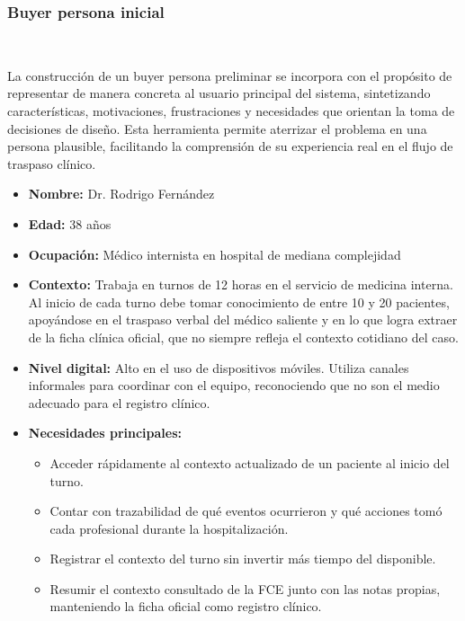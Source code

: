\subsubsection*{Buyer persona inicial} ~

La construcción de un buyer persona preliminar se incorpora con el propósito de representar de manera concreta al usuario principal del sistema, sintetizando características, motivaciones, frustraciones y necesidades que orientan la toma de decisiones de diseño. Esta herramienta permite aterrizar el problema en una persona plausible, facilitando la comprensión de su experiencia real en el flujo de traspaso clínico.\\

\begin{itemize}
    \item \textbf{Nombre:} Dr. Rodrigo Fernández
    \item \textbf{Edad:} 38 años
    \item \textbf{Ocupación:} Médico internista en hospital de mediana complejidad
    \item \textbf{Contexto:} Trabaja en turnos de 12 horas en el servicio de medicina interna. Al inicio de cada turno debe tomar conocimiento de entre 10 y 20 pacientes, apoyándose en el traspaso verbal del médico saliente y en lo que logra extraer de la ficha clínica oficial, que no siempre refleja el contexto cotidiano del caso.
    \item \textbf{Nivel digital:} Alto en el uso de dispositivos móviles. Utiliza canales informales para coordinar con el equipo, reconociendo que no son el medio adecuado para el registro clínico.

    \item \textbf{Necesidades principales:}
    \begin{itemize}
        \item Acceder rápidamente al contexto actualizado de un paciente al inicio del turno.
        \item Contar con trazabilidad de qué eventos ocurrieron y qué acciones tomó cada profesional durante la hospitalización.
        \item Registrar el contexto del turno sin invertir más tiempo del disponible.
        \item Resumir el contexto consultado de la FCE junto con las notas propias, manteniendo la ficha oficial como registro clínico.
    \end{itemize}


\end{itemize}
